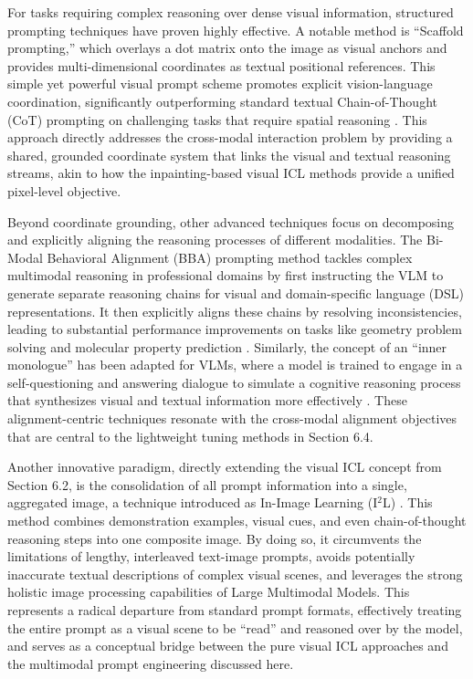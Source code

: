 \documentclass[11pt]{article}
\begin{document}
For tasks requiring complex reasoning over dense visual information, structured prompting techniques have proven highly effective. A notable method is ``Scaffold prompting,'' which overlays a dot matrix onto the image as visual anchors and provides multi-dimensional coordinates as textual positional references. This simple yet powerful visual prompt scheme promotes explicit vision-language coordination, significantly outperforming standard textual Chain-of-Thought (CoT) prompting on challenging tasks that require spatial reasoning \cite{ref241}. This approach directly addresses the cross-modal interaction problem by providing a shared, grounded coordinate system that links the visual and textual reasoning streams, akin to how the inpainting-based visual ICL methods provide a unified pixel-level objective.

Beyond coordinate grounding, other advanced techniques focus on decomposing and explicitly aligning the reasoning processes of different modalities. The Bi-Modal Behavioral Alignment (BBA) prompting method tackles complex multimodal reasoning in professional domains by first instructing the VLM to generate separate reasoning chains for visual and domain-specific language (DSL) representations. It then explicitly aligns these chains by resolving inconsistencies, leading to substantial performance improvements on tasks like geometry problem solving and molecular property prediction \cite{ref242}. Similarly, the concept of an ``inner monologue'' has been adapted for VLMs, where a model is trained to engage in a self-questioning and answering dialogue to simulate a cognitive reasoning process that synthesizes visual and textual information more effectively \cite{ref243}. These alignment-centric techniques resonate with the cross-modal alignment objectives that are central to the lightweight tuning methods in Section 6.4.

Another innovative paradigm, directly extending the visual ICL concept from Section 6.2, is the consolidation of all prompt information into a single, aggregated image, a technique introduced as In-Image Learning (I\(^2\)L) \cite{ref235}. This method combines demonstration examples, visual cues, and even chain-of-thought reasoning steps into one composite image. By doing so, it circumvents the limitations of lengthy, interleaved text-image prompts, avoids potentially inaccurate textual descriptions of complex visual scenes, and leverages the strong holistic image processing capabilities of Large Multimodal Models. This represents a radical departure from standard prompt formats, effectively treating the entire prompt as a visual scene to be ``read'' and reasoned over by the model, and serves as a conceptual bridge between the pure visual ICL approaches and the multimodal prompt engineering discussed here.
\end{document}
